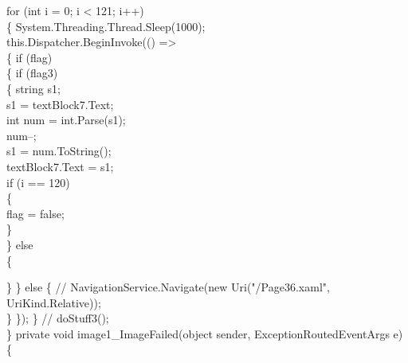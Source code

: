 {{            for (int i = 0; i < 121; i++)\\
            \{
                System.Threading.Thread.Sleep(1000);\\

                this.Dispatcher.BeginInvoke(() =>\\
                \{
                    if (flag)\\
                    \{
                        if (flag3)\\
                        \{
                            string s1;\\
                            s1 = textBlock7.Text;\\
                            int num = int.Parse(s1);\\
                            num--;\\
                            s1 = num.ToString();\\
                            textBlock7.Text = s1;\\
                       
                            if (i == 120)\\
                            \{\\
                                flag = false;\\
                            \}\\
                        \}
                        else\\
                        \{
                            
                        \}
                    \}
                    else
                    \{
                       // NavigationService.Navigate(new Uri("/Page36.xaml", UriKind.Relative));\\
                    \}
                \});
            \}
            //    doStuff3();\\
        \}
        private void image1_ImageFailed(object sender, ExceptionRoutedEventArgs e)\\
        \{

}}

